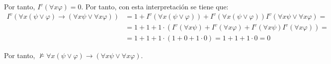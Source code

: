 \begin{ejercicio}
    Por tanto, $I^v(\forall x \varphi)=0$. Por tanto, con esta interpretación se tiene que:
    \begin{align*}
        I^v\left(\forall x(\psi \vee \varphi) \rightarrow (\forall x \psi \vee \forall x \varphi)\right)
        &= 1+I^v(\forall x(\psi \vee \varphi))+I^v(\forall x(\psi \vee \varphi))I^v(\forall x \psi \vee \forall x \varphi) =\\&= 1+1+1\cdot \left(I^v(\forall x \psi) + I^v(\forall x \varphi) + I^v(\forall x \psi)I^v(\forall x \varphi)\right) =\\&= 1+1+1\cdot(1+0+1\cdot 0) = 1+1+1\cdot 0 = 0
    \end{align*}

    Por tanto, $\not\models \forall x(\psi \vee \varphi) \rightarrow (\forall x \psi \vee \forall x \varphi)$.
\end{ejercicio}

